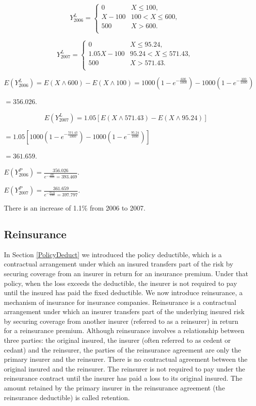 \documentclass[]{book}
\begin{document}
\[Y_{2006}^{L} = \left\{ \begin{matrix}
0 & X \leq 100, \\
X - 100 & 100 <  X \leq 600, \\
500 & X > 600. \\
\end{matrix} \right.\ \]

\[Y_{2007}^{L} = \left\{ \begin{matrix}
0 & X \leq 95.24, \\
1.05X - 100 & 95.24 <  X \leq 571.43, \\
500 & X > 571.43. \\
\end{matrix} \right.\ \]

\[E\left( Y_{2006}^{L} \right) = E\left( X \land 600 \right) - E\left( X \land 100 \right) = 1000\left( {1 - e}^{- \frac{600}{1000}} \right) - 1000\left( {1 - e}^{- \frac{100}{1000}} \right)\]

\(= 356.026\).

\[E\left( Y_{2007}^{L} \right) = 1.05\left\lbrack E\left( X \land 571.43 \right) - E\left( X \land 95.24 \right) \right\rbrack\]

\(= 1.05\left\lbrack 1000\left( {1 - e}^{- \frac{571.43}{1000}} \right) - 1000\left( {1 - e}^{- \frac{95.24}{1000}} \right) \right\rbrack\)

\(\mathbf{=}361.659\).

\(E\left( Y_{2006}^{P} \right) = \frac{356.026}{e^{- \frac{100}{1000}} = 393.469}\).

\(E\left( Y_{2007}^{P} \right) = \frac{361.659}{e^{- \frac{95.24}{1000}} = 397.797}\).

There is an increase of 1.1\% from 2006 to 2007.

\subsection{Reinsurance}\label{reinsurance}

In Section \ref{PolicyDeduct} we introduced the policy deductible, which
is a contractual arrangement under which an insured transfers part of
the risk by securing coverage from an insurer in return for an insurance
premium. Under that policy, when the loss exceeds the deductible, the
insurer is not required to pay until the insured has paid the fixed
deductible. We now introduce reinsurance, a mechanism of insurance for
insurance companies. Reinsurance is a contractual arrangement under
which an insurer transfers part of the underlying insured risk by
securing coverage from another insurer (referred to as a reinsurer) in
return for a reinsurance premium. Although reinsurance involves a
relationship between three parties: the original insured, the insurer
(often referred to as cedent or cedant) and the reinsurer, the parties
of the reinsurance agreement are only the primary insurer and the
reinsurer. There is no contractual agreement between the original
insured and the reinsurer. The reinsurer is not required to pay under
the reinsurance contract until the insurer has paid a loss to its
original insured. The amount retained by the primary insurer in the
reinsurance agreement (the reinsurance deductible) is called retention.
\end{document}
